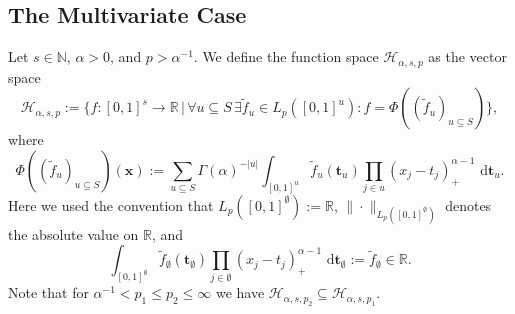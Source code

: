 \documentclass[12pt]{article}
\newcommand{\bsx}{\boldsymbol{x}}
\newcommand{\bst}{\boldsymbol{t}}
\newcommand{\rd}{\,\mathrm{d}}
\newcommand{\NN}{\mathbb{N}}
\newcommand{\RR}{\mathbb{R}}
\newcommand{\HH}{\mathcal{H}}
\begin{document}

\subsection{The Multivariate Case}
\label{Subsec:Frac_Multi}


Let $s\in \NN$, $\alpha>0$, and $p>\alpha^{-1}$.
We define the function space $\HH_{\alpha,s,p}$ as the vector space
\begin{equation}\label{def_frac_H_alpha_s_p}
\HH_{\alpha,s,p} := \{ f:[0,1]^s \to \RR \,|\,
\forall u \subseteq S \,\exists \tilde{f}_u \in
L_p([0,1]^{u}) : f =
\Phi((\tilde{f}_u)_{u\subseteq S}) \},
\end{equation}
where
\begin{equation}
\label{Phi}
\Phi((\tilde{f}_u)_{u\subseteq S})(\bsx) :=
\sum_{u\subseteq S} \Gamma(\alpha)^{-|u|}
\int_{[0,1]^{u}} \tilde{f}_u(\bst_u) \prod_{j\in u}
(x_j-t_j)^{\alpha-1}_+ \, \rd \bst_u.
\end{equation}
Here we used the convention that $L_p([0,1]^{\emptyset}) :=\RR$,
$\|\cdot\|_{L_p([0,1]^{\emptyset})}$ denotes the absolute value on $\RR$,
and
\begin{equation*}
\int_{[0,1]^{\emptyset}} \tilde{f}_\emptyset(\bst_\emptyset)
\prod_{j\in\emptyset} (x_j-t_j)^{\alpha-1}_+\,\rd \bst_\emptyset
:= \tilde{f}_\emptyset \in \RR.
\end{equation*}
Note that for $\alpha^{-1} < p_1 \le p_2 \le \infty$ we have $\HH_{\alpha,s,p_2} \subseteq \HH_{\alpha,s,p_1}$.
\end{document}
